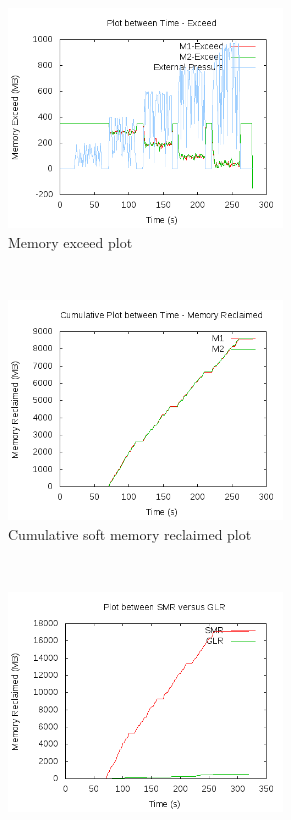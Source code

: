 	\begin{figure}[t!]
	  \centering
	  \begin{subfigure}[t]{0.48\textwidth}
	    \centering
	    \includegraphics[width=0.8\textwidth]{images/experimentation/exceed_only/Exceed.png}
	    \caption{Memory exceed plot}
	    \label{img_exceed_only_1_exceed}
	  \end{subfigure}
	  ~ 
	  \begin{subfigure}[t]{0.48\textwidth}
	    \centering
	    \includegraphics[width=0.8\textwidth]{images/experimentation/exceed_only/Memory_Reclaimed.png}
	    \caption{Cumulative soft memory reclaimed plot}
	    \label{img_exceed_only_1_smr}
	  \end{subfigure}
	  ~ 
	  \begin{subfigure}[t]{0.48\textwidth}
	    \centering
	    \includegraphics[width=0.8\textwidth]{images/experimentation/exceed_only/compare.png}

\end{subfigure}
\end{figure}
